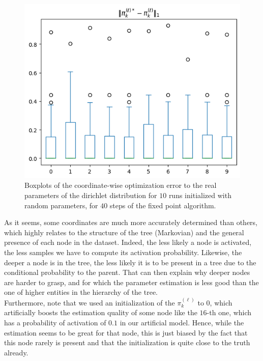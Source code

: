 \begin{figure}[H]
    \centering
    \includegraphics[scale=0.6]{images/markovian_tree_model_error_estimators_dirichlet_boxplot}
    \caption{Boxplots of the coordinate-wise optimization error to the real parameters of the dirichlet distribution for $10$ runs initialized with random parameters, for $40$ steps of the fixed point algorithm.}
    \label{fig:markovian_tree_model_error_estimations_dirichlet_boxplot}
\end{figure}

As it seems, some coordinates are much more accurately determined than others, which highly relates to the structure of the tree (Markovian)
and the general presence of each node in the dataset.
Indeed, the less likely a node is activated, the less samples we have to compute its activation probability.
Likewise, the deeper a node is in the tree, the less likely it is to be present in a tree due to the conditional probability to the parent.
That can then explain why deeper nodes are harder to grasp, and for which the parameter estimation is less good than the one of higher entities in the hierarchy of the tree. \\

Furthermore, note that we used an initialization of the $\pi_k^{(\ell)}$ to $0$, which artificially boosts the estimation quality of some node like the $16$-th one, which has a probability of activation of $0.1$
in our artificial model.
Hence, while the estimation seems to be great for that node, this is just biased by the fact that this node rarely is present and that the initialization is quite close to the truth already. \\

